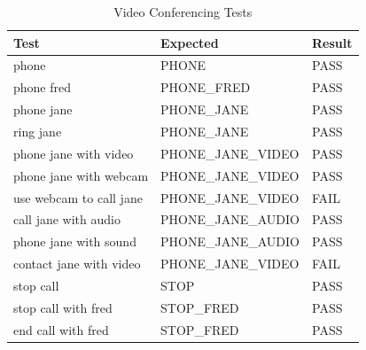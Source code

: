 \documentclass[11pt]{article}
\begin{document}
\begin{table}[H]
\scriptsize
\centering
\caption{Video Conferencing Tests}
\label{table:calling-scores}
\begin{tabular}{lll}
\multicolumn{1}{l|}{Test}                           & \multicolumn{1}{l|}{Expected}           & Result                       \\ \hline
\multicolumn{1}{l|}{phone}                          & \multicolumn{1}{l|}{PHONE}              & \cellcolor[HTML]{67FD9A}PASS \\ \hline
\multicolumn{1}{l|}{phone fred}                     & \multicolumn{1}{l|}{PHONE\_FRED}        & \cellcolor[HTML]{67FD9A}PASS \\ \hline
\multicolumn{1}{l|}{phone jane}                     & \multicolumn{1}{l|}{PHONE\_JANE}        & \cellcolor[HTML]{67FD9A}PASS \\ \hline
\multicolumn{1}{l|}{ring jane}                      & \multicolumn{1}{l|}{PHONE\_JANE}        & \cellcolor[HTML]{67FD9A}PASS \\ \hline
\multicolumn{1}{l|}{phone jane with video}          & \multicolumn{1}{l|}{PHONE\_JANE\_VIDEO} & \cellcolor[HTML]{67FD9A}PASS \\ \hline
\multicolumn{1}{l|}{phone jane with webcam}         & \multicolumn{1}{l|}{PHONE\_JANE\_VIDEO} & \cellcolor[HTML]{67FD9A}PASS \\ \hline
\multicolumn{1}{l|}{use webcam to call jane}        & \multicolumn{1}{l|}{PHONE\_JANE\_VIDEO} & \cellcolor[HTML]{FD6864}FAIL \\ \hline
\multicolumn{1}{l|}{call jane with audio}           & \multicolumn{1}{l|}{PHONE\_JANE\_AUDIO} & \cellcolor[HTML]{67FD9A}PASS \\ \hline
\multicolumn{1}{l|}{phone jane with sound}          & \multicolumn{1}{l|}{PHONE\_JANE\_AUDIO} & \cellcolor[HTML]{67FD9A}PASS \\ \hline
\multicolumn{1}{l|}{contact jane with video}        & \multicolumn{1}{l|}{PHONE\_JANE\_VIDEO} & \cellcolor[HTML]{FD6864}FAIL \\ \hline
\multicolumn{1}{l|}{stop call}                      & \multicolumn{1}{l|}{STOP}               & \cellcolor[HTML]{67FD9A}PASS \\ \hline
\multicolumn{1}{l|}{stop call with fred}            & \multicolumn{1}{l|}{STOP\_FRED}         & \cellcolor[HTML]{67FD9A}PASS \\ \hline
\multicolumn{1}{l|}{end call with fred}             & \multicolumn{1}{l|}{STOP\_FRED}         & \cellcolor[HTML]{67FD9A}PASS \\ \hline

\end{tabular}
\end{table}
\end{document}
